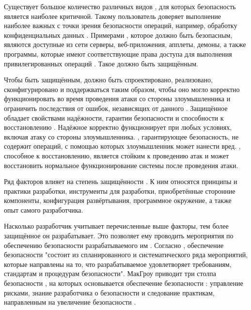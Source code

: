 %
Существует большое количество различных видов , для которых безопасность 
является наиболее критичной. 
%
Такому  пользователь доверяет выполнение наиболее важных с точки зрения 
безопасности операций, например, обработку конфиденциальных данных . 
%
Примерами , которое должно быть безопасным, являются доступные из сети 
серверы, веб-приложения, апплеты, демоны, а также программы, которые имеют соответствующие права 
доступа для выполнения привилегированных операций . 
%
Такое  должно быть защищённым.

%
Чтобы быть защищённым,  должно быть спроектировано, реализовано, 
сконфигурировано и поддержваться таким образом, чтобы оно могло корректно функционировать во время 
проведения атаки со стороны злоумышленника и ограничить последствия от ошибок, независящих 
от данного  . 
%
Защищённое  обладает свойствами надёжности, гарантии безопасности и 
способности к восстановлению . 
%
Надёжное  корректно функционирует при любых условиях, включая атаку 
со стороны злоумышленника. 
%
, гарантирующее безопасность, не содержит операций, с помощью которых 
злоумышленник может нанести вред. 
%
, способное к восстановлению, является стойким к проведению атак и может 
восстановить нормальное функционирование системы после проведения атаки.

%
Ряд факторов влияет на степень защищённости  . 
%
К ним относятся принципы и практики разработки, инструменты для разработки, приобретённые сторонние 
компоненты, конфигурация развёртывания, программное окружение, а также опыт самого разработчика.

%
Насколько разработчик учитывает перечисленные выше факторы, тем более защищённое 
 он разрабатывает. 
%
Это позволяет ему проводить мероприятия по обеспечению безопасности разрабатываемого им 
. 
%
Согласно , обеспечение безопасности  "состоит из 
спланированного и систематического ряда мероприятий, которые направлены на то, что разрабатываемое 
 удовлетворяет требованиям, стандартам и процедурам безопасности".
%
МакГроу приводит три столпа безопасности , на которых основывается 
обеспечение безопасности : управление рисками, знание разработчика 
о безопасности и следование практикам, направленным на увеличение безопасности 
.

